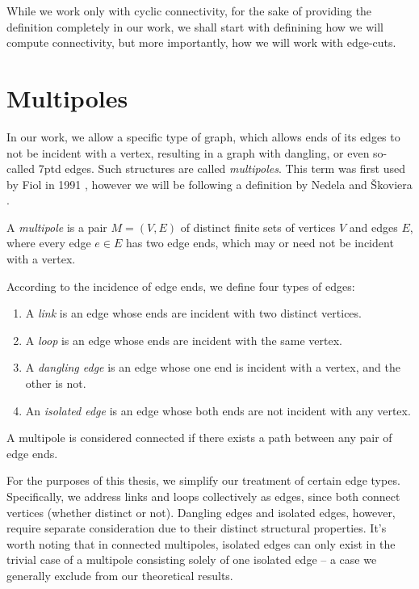 \documentclass[12pt, twoside]{book}
\begin{document}
While we work only with cyclic connectivity, for the sake of providing the definition completely in our work, we shall start with definining how we will compute connectivity, but more importantly, how we will work with edge-cuts.

\section{Multipoles}\label{sec:multipoles}

In our work, we allow a specific type of graph, which allows ends of its edges to not be incident with a vertex, resulting in a graph with dangling, or even so-called 7ptd edges. Such structures are called \textit{multipoles}. This term was first used by Fiol in 1991 \cite{Fiol1991}, however we will be following a definition by Nedela and Škoviera \cite{Nedela1996}.

\begin{definition}
	A \textit{multipole} is a pair $M=(V,E)$ of distinct finite sets of vertices $V$ and edges $E$, where every edge $e\in E$ has two edge ends, which may or need not be incident with a vertex.
	
	According to the incidence of edge ends, we define four types of edges:
	\begin{enumerate}[nolistsep]
		\item A \textit{link} is an edge whose ends are incident with two distinct vertices.
		\item A \textit{loop} is an edge whose ends are incident with the same vertex.
		\item A \textit{dangling edge} is an edge whose one end is incident with a vertex, and the other is not.
		\item An \textit{isolated edge} is an edge whose both ends are not incident with any vertex.
	\end{enumerate}
\end{definition}

A multipole is considered connected if there exists a path between any pair of edge ends.

For the purposes of this thesis, we simplify our treatment of certain edge types. Specifically, we address links and loops collectively as edges, since both connect vertices (whether distinct or not). Dangling edges and isolated edges, however, require separate consideration due to their distinct structural properties. It's worth noting that in connected multipoles, isolated edges can only exist in the trivial case of a multipole consisting solely of one isolated edge -- a case we generally exclude from our theoretical results.
\end{document}
